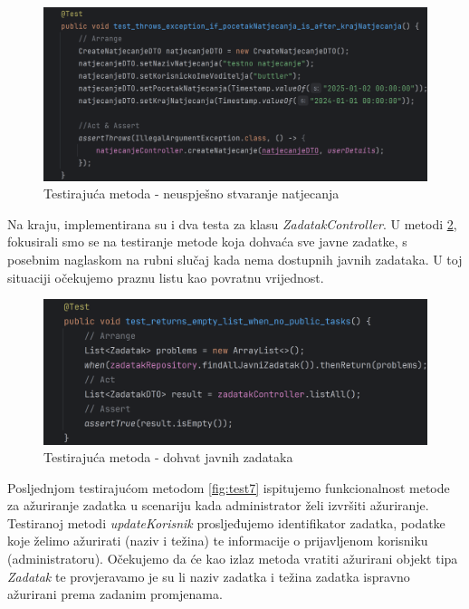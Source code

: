 \begin{figure}[H]
	\includegraphics[scale=0.2]{slike/test5.png}
	\centering
	\caption{Testirajuća metoda - neuspješno stvaranje natjecanja}
	\label{fig:test5}
\end{figure}

Na kraju, implementirana su i dva testa za klasu \textit{ZadatakController}. U metodi \ref{fig:test6}, fokusirali smo se na testiranje metode koja dohvaća sve javne zadatke, s posebnim naglaskom na rubni slučaj kada nema dostupnih javnih zadataka. U toj situaciji očekujemo praznu listu kao povratnu vrijednost.

\begin{figure}[H]
	\includegraphics[scale=0.2]{slike/test6.png}
	\centering
	\caption{Testirajuća metoda - dohvat javnih zadataka}
	\label{fig:test6}
\end{figure}

Posljednjom testirajućom metodom \ref{fig:test7} ispitujemo funkcionalnost metode za ažuriranje zadatka u scenariju kada administrator želi izvršiti ažuriranje. Testiranoj metodi \textit{updateKorisnik} prosljeđujemo identifikator zadatka, podatke koje želimo ažurirati (naziv i težina) te informacije o prijavljenom korisniku (administratoru). Očekujemo da će kao izlaz metoda vratiti ažurirani objekt tipa \textit{Zadatak} te provjeravamo je su li naziv zadatka i težina zadatka ispravno ažurirani prema zadanim promjenama.


